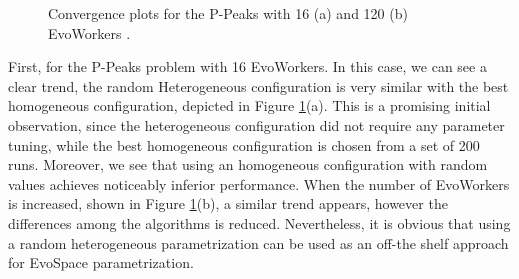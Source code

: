 \begin{figure}[!ht]
    \centering
    \caption{Convergence plots for the P-Peaks with 16 (a) and 120 (b)
      EvoWorkers .}
    \label{fig:PPeaks}
\end{figure}



First, for the P-Peaks problem with 16 EvoWorkers.
In this case, we can see a clear trend, the random Heterogeneous configuration is very similar with the best homogeneous configuration,
depicted in Figure \ref{fig:PPeaks}(a).
This is a promising initial observation, since the heterogeneous configuration did not require any parameter tuning, while the best homogeneous configuration
is chosen from a set of 200 runs.
Moreover, we see that using an homogeneous configuration with random values achieves noticeably inferior performance.
When the number of EvoWorkers is increased, shown in Figure \ref{fig:PPeaks}(b), a similar trend appears,
however the differences among the algorithms is reduced.
Nevertheless, it is obvious that using a random heterogeneous parametrization can be used as an off-the shelf approach for EvoSpace parametrization.





